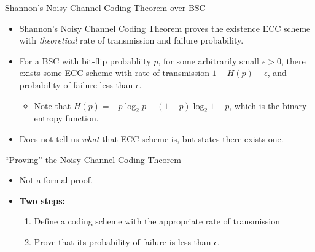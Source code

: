 \documentclass[aspectratio=169]{beamer}
\begin{document}
  \begin{frame}{Shannon's Noisy Channel Coding Theorem over BSC}
      \begin{itemize}
        \item Shannon's Noisy Channel Coding Theorem proves the existence ECC scheme with \textit{theoretical} rate of transmission and failure probability.
        \item For a BSC with bit-flip probabliity $p$, for some arbitrarily small $\epsilon > 0$, there exists some ECC scheme with rate of transmission $1 - H(p) - \epsilon$, and probability of failure less than $\epsilon$.
              \begin{itemize}
                      \item Note that $H(p) = -p\log_{2}{p}-(1-p)\log_{2}{1-p}$, which is the binary entropy function.
                \end{itemize}
        \item Does not tell us \textit{what} that ECC scheme is, but states there exists one.
        \end{itemize}
    \end{frame}

    \begin{frame}{``Proving'' the Noisy Channel Coding Theorem}
      \begin{itemize}
      \item Not a formal proof.
      \item \textbf{Two steps:}
        \begin{enumerate}
                \item Define a coding scheme with the appropriate rate of transmission
                \item Prove that its probability of failure is less than $\epsilon$.
                \end{enumerate}
              \end{itemize}
      \end{frame}
\end{document}
